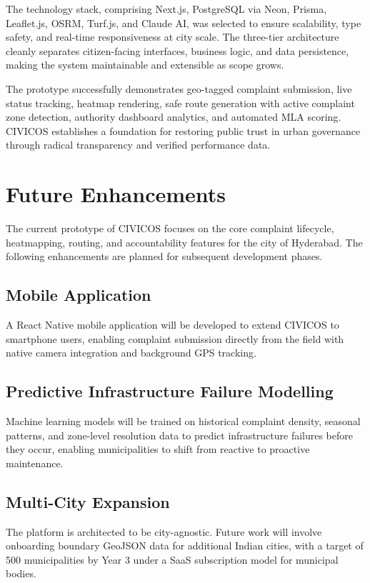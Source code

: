 \documentclass[12pt,a4paper]{report}
\begin{document}
The technology stack, comprising Next.js, PostgreSQL via Neon, Prisma,
Leaflet.js, OSRM, Turf.js, and Claude AI, was selected to ensure scalability, type
safety, and real-time responsiveness at city scale. The three-tier
architecture cleanly separates citizen-facing interfaces, business logic,
and data persistence, making the system maintainable and extensible as
scope grows.

The prototype successfully demonstrates geo-tagged complaint submission,
live status tracking, heatmap rendering, safe route generation with active
complaint zone detection, authority dashboard analytics, and automated MLA
scoring. CIVICOS establishes a foundation for restoring public trust in
urban governance through radical transparency and verified performance data.

\chapter[FUTURE ENHANCEMENTS]{Future Enhancements}

The current prototype of CIVICOS focuses on the core complaint lifecycle,
heatmapping, routing, and accountability features for the city of Hyderabad.
The following enhancements are planned for subsequent development phases.

\section{Mobile Application}
A React Native mobile application will be developed to extend CIVICOS to
smartphone users, enabling complaint submission directly from the field with
native camera integration and background GPS tracking.

\section{Predictive Infrastructure Failure Modelling}
Machine learning models will be trained on historical complaint density,
seasonal patterns, and zone-level resolution data to predict infrastructure
failures before they occur, enabling municipalities to shift from reactive
to proactive maintenance.

\section{Multi-City Expansion}
The platform is architected to be city-agnostic. Future work will involve
onboarding boundary GeoJSON data for additional Indian cities, with a target
of 500 municipalities by Year 3 under a SaaS subscription model for
municipal bodies.
\end{document}

